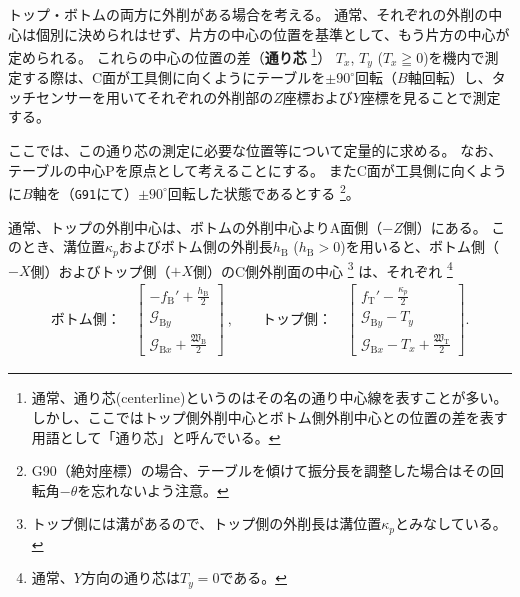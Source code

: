 


トップ・ボトムの両方に外削がある場合を考える。
通常、それぞれの外削の中心は個別に決められはせず、片方の中心の位置を基準として、もう片方の中心が定められる。
これらの中心の位置の差（\textbf{通り芯}
\footnote{通常、通り芯(centerline)というのはその名の通り中心線を表すことが多い。
しかし、ここではトップ側外削中心とボトム側外削中心との位置の差を表す用語として「通り芯」と呼んでいる。}）
$T_x$, $T_y$ ($T_x \geqq 0$)を機内で測定する際は、C面が工具側に向くようにテーブルを$\pm90^\circ$回転（$B$軸回転）し、タッチセンサーを用いてそれぞれの外削部の$Z$座標および$Y$座標を見ることで測定する。

ここでは、この通り芯の測定に必要な位置等について定量的に求める。
なお、テーブルの中心Pを原点として考えることにする。
またC面が工具側に向くように$B$軸を（\verb|G91|にて）$\pm90^\circ$回転した状態であるとする
\footnote{G90（絶対座標）の場合、テーブルを傾けて振分長を調整した場合はその回転角$-\theta$を忘れないよう注意。}。



通常、トップの外削中心は、ボトムの外削中心よりA面側（$-Z$側）にある。
このとき、溝位置$\kappa_p$およびボトム側の外削長$h_\mathrm B$ ($h_\mathrm B > 0$)を用いると、ボトム側（$-X$側）およびトップ側（$+X$側）のC側外削面の中心
\footnote{トップ側には溝があるので、トップ側の外削長は溝位置$\kappa_p$とみなしている。}
は、それぞれ
\footnote{通常、$Y$方向の通り芯は$T_y = 0$である。}
\begin{align*}
  \text{ボトム側：}\quad
  \left[
    \begin{array}{c}
      \displaystyle -f_\mathrm B'+\frac{h_\mathrm B}2\\[5pt]
      \mathcal G_{\mathrm By}\\[3pt]
      \displaystyle \mathcal G_{\mathrm Bx}+\frac{\mathfrak W_\mathrm B}2
    \end{array}
    \right]~, \qquad
  \text{トップ側：}\quad
  \left[
    \begin{array}{c}
      \displaystyle f_\mathrm T'-\frac{\kappa_p}2\\[5pt]
      \mathcal G_{\mathrm By}-T_y\\[3pt]
      \displaystyle \mathcal G_{\mathrm Bx}-T_x+\frac{\mathfrak W_\mathrm T}2
    \end{array}
  \right].
\end{align*}



